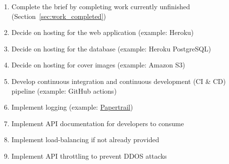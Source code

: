 \documentclass[a4paper]{article}
\begin{document}
\begin{enumerate}
  \item Complete the brief by completing work currently unfinished (Section~\ref{sec:work_completed})
  \item Decide on hosting for the web application (example: Heroku)
  \item Decide on hosting for the database (example: Heroku PostgreSQL)
  \item Decide on hosting for cover images (example: Amazon S3)
  \item Develop continuous integration and continuous development (CI \& CD) pipeline (example: GitHub actions)
  \item Implement logging (example: \href{https://www.papertrail.com/}{Papertrail})
  \item Implement API documentation for developers to consume
  \item Implement load-balancing if not already provided
  \item Implement API throttling to prevent DDOS attacks
\end{enumerate}
\end{document}

